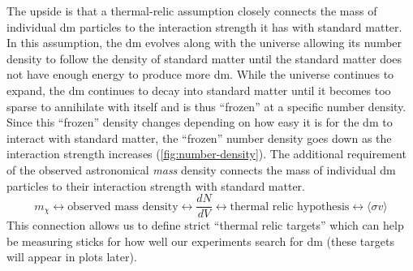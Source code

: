 The upside is that a thermal-relic assumption closely connects the mass of individual \ac{dm}
particles to the interaction strength it has with standard matter. In this assumption, the \ac{dm}
evolves along with the universe allowing its number density to follow the density of standard
matter until the standard matter does not have enough energy to produce more \ac{dm}. While the
universe continues to expand, the \ac{dm} continues to decay into standard matter until it becomes
too sparse to annihilate with itself and is thus ``frozen'' at a specific number density. Since
this ``frozen'' density changes depending on how easy it is for the \ac{dm} to interact with
standard matter, the ``frozen'' number density goes down as the interaction strength increases
(\cref{fig:number-density}). The additional requirement of the observed astronomical \emph{mass}
density connects the mass of individual \ac{dm} particles to their interaction strength with
standard matter.
\begin{equation}\label{eqn:dm-mass-interaction-strength-connection}
  m_\chi \leftrightarrow \text{observed mass density}
  \leftrightarrow \frac{dN}{dV} \leftrightarrow
  \text{thermal relic hypothesis} \leftrightarrow
  \langle\sigma v\rangle
\end{equation}
This connection allows us to define strict ``thermal relic targets'' which can help be measuring
sticks for how well our experiments search for \ac{dm} (these targets will appear in plots later).

